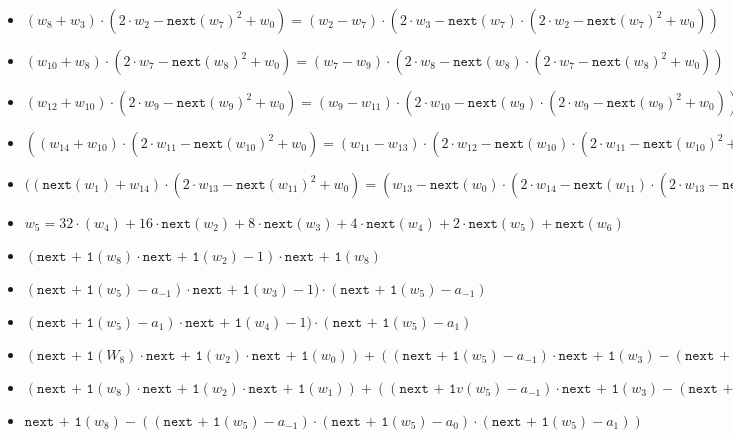 \begin{itemize}
    \item $(w_{8} + w_{3}) \cdot (2 \cdot w_2 - \texttt{next}(w_7)^2 + w_{0}) = (w_2 - w_7) \cdot (2\cdot w_{3} - \texttt{next}(w_7) \cdot (2 \cdot w_2 - \texttt{next}(w_7)^2 + w_{0}))$
    \item $(w_{10} + w_{8}) \cdot (2 \cdot w_7 - \texttt{next}(w_8)^2 + w_{0}) = (w_7 - w_9) \cdot (2\cdot w_{8} - \texttt{next}(w_8) \cdot (2 \cdot w_7 - \texttt{next}(w_8)^2 + w_{0}))$
    \item $(w_{12} + w_{10}) \cdot (2 \cdot w_9 - \texttt{next}(w_9)^2 + w_{0}) = (w_9 - w_{11}) \cdot (2\cdot w_{10} - \texttt{next}(w_9) \cdot (2 \cdot w_9 - \texttt{next}(w_9)^2 + w_{0}))$
    \item $((w_{14} + w_{10}) \cdot  (2 \cdot w_{11} - \texttt{next}(w_{10})^2 + w_{0}) = (w_{11} - w_{13}) \cdot (2\cdot w_{12} - \texttt{next}(w_{10}) \cdot (2 \cdot w_{11} - \texttt{next}(w_{10})^2 + w_{0}))) \cdot  (\texttt{next + 1}(w_8)\cdot \texttt{next + 1}(w_2))$
    \item $((\texttt{next}(w_{1}) + w_{14}) \cdot (2 \cdot w_{13} - \texttt{next}(w_{11})^2 + w_{0}) = (w_{13} - \texttt{next}(w_{0}) \cdot (2\cdot w_{14} - \texttt{next}(w_{11}) \cdot (2 \cdot w_{13} - \texttt{next}(w_{11})^2 + w_{0}))) \cdot  (\texttt{next + 1}(w_8)\cdot \texttt{next + 1}(w_2))$ \\
    \item $w_5 = 32 \cdot (w_4) + 16 \cdot \texttt{next}(w_{2}) + 8 \cdot \texttt{next}(w_{3}) + 4 \cdot \texttt{next}(w_{4}) + 2 \cdot \texttt{next}(w_{5}) + \texttt{next}(w_{6})$
    \item $(\texttt{next + 1}(w_8)\cdot \texttt{next + 1}(w_2) - 1) \cdot \texttt{next + 1}(w_8)$
    \item $ (\texttt{next + 1}(w_5) - a_{-1})\cdot \texttt{next + 1}(w_3) - 1) \cdot (\texttt{next + 1}(w_5) - a_{-1})$
     \item $(\texttt{next + 1}(w_5) - a_1)\cdot \texttt{next + 1}(w_4) - 1) \cdot (\texttt{next + 1}(w_5) - a_1)$
	\item $(\texttt{next + 1}(W_8)\cdot \texttt{next + 1}(w_2)\cdot \texttt{next + 1}(w_0)) + ((\texttt{next + 1}(w_5) - a_{-1})\cdot \texttt{next + 1}(w_3) - (\texttt{next + 1}(w_5) - a_1)\cdot \texttt{next + 1}(w_4))\cdot (\texttt{next + 1}(w_5) - a_{-1})\cdot \texttt{next + 1}(w_3) - (\texttt{next + 1}(w_5) - a_1)\cdot \texttt{next + 1}(w_4)) \cdot \texttt{next + 1}(w_6) - \texttt{next + 1}(w_0)$
      \item $(\texttt{next + 1}(w_8)\cdot \texttt{next + 1}(w_2)\cdot \texttt{next + 1}(w_1)) +((\texttt{next + 1}v(w_5) - a_{-1})\cdot \texttt{next + 1}(w_3) - (\texttt{next + 1}(w_5) - a_1)\cdot \texttt{next + 1}(w_4)) \cdot \texttt{next + 1}(w_7) - \texttt{next + 1}(w_1)$
      \item $\texttt{next + 1}(w_8) - ((\texttt{next + 1}(w_5) -a_{-1})\cdot (\texttt{next + 1}(w_5) - a_0) \cdot
(\texttt{next + 1}(w_5) - a_1))$ 
\end{itemize}    

